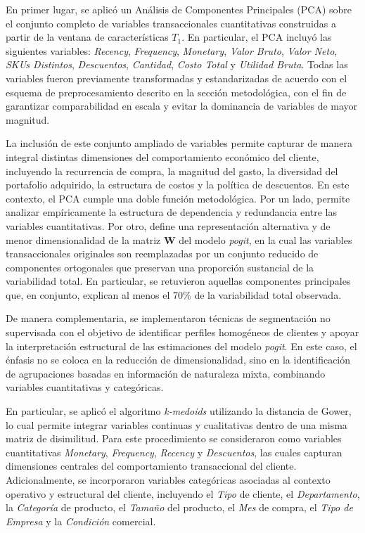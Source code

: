     En primer lugar, se aplicó un Análisis de Componentes Principales (PCA) sobre el conjunto completo de variables transaccionales cuantitativas construidas a partir de la ventana de características $T_1$. En particular, el PCA incluyó las siguientes variables: \textit{Recency}, \textit{Frequency}, \textit{Monetary}, \textit{Valor Bruto}, \textit{Valor Neto}, \textit{SKUs Distintos}, \textit{Descuentos}, \textit{Cantidad}, \textit{Costo Total} y \textit{Utilidad Bruta}. Todas las variables fueron previamente transformadas y estandarizadas de acuerdo con el esquema de preprocesamiento descrito en la sección metodológica, con el fin de garantizar comparabilidad en escala y evitar la dominancia de variables de mayor magnitud.
    
    La inclusión de este conjunto ampliado de variables permite capturar de manera integral distintas dimensiones del comportamiento económico del cliente, incluyendo la recurrencia de compra, la magnitud del gasto, la diversidad del portafolio adquirido, la estructura de costos y la política de descuentos. En este contexto, el PCA cumple una doble función metodológica. Por un lado, permite analizar empíricamente la estructura de dependencia y redundancia entre las variables cuantitativas. Por otro, define una representación alternativa y de menor dimensionalidad de la matriz $\mathbf{W}$ del modelo \emph{pogit}, en la cual las variables transaccionales originales son reemplazadas por un conjunto reducido de componentes ortogonales que preservan una proporción sustancial de la variabilidad total. En particular, se retuvieron aquellas componentes principales que, en conjunto, explican al menos el 70\% de la variabilidad total observada.
    
    De manera complementaria, se implementaron técnicas de segmentación no supervisada con el objetivo de identificar perfiles homogéneos de clientes y apoyar la interpretación estructural de las estimaciones del modelo \emph{pogit}. En este caso, el énfasis no se coloca en la reducción de dimensionalidad, sino en la identificación de agrupaciones basadas en información de naturaleza mixta, combinando variables cuantitativas y categóricas.
    
    En particular, se aplicó el algoritmo \emph{k-medoids} utilizando la distancia de Gower, lo cual permite integrar variables continuas y cualitativas dentro de una misma matriz de disimilitud. Para este procedimiento se consideraron como variables cuantitativas \textit{Monetary}, \textit{Frequency}, \textit{Recency} y \textit{Descuentos}, las cuales capturan dimensiones centrales del comportamiento transaccional del cliente. Adicionalmente, se incorporaron variables categóricas asociadas al contexto operativo y estructural del cliente, incluyendo el \textit{Tipo} de cliente, el \textit{Departamento}, la \textit{Categoría} de producto, el \textit{Tamaño} del producto, el \textit{Mes} de compra, el \textit{Tipo de Empresa} y la \textit{Condición} comercial.
    

